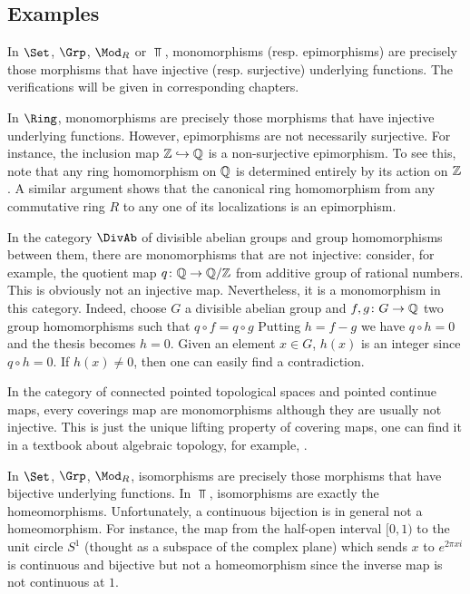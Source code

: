 \subsection{Examples}
  \begin{exam}
    In $\Set$, $\Grp$, $\Mod_R$ or $\Top$, monomorphisms (resp. epimorphisms) are precisely those morphisms that have injective (resp. surjective) underlying functions. The verifications will be given in corresponding chapters.
  \end{exam}
  \begin{exam}\label{exam:nonsurjective epi}
    In $\Ring$, monomorphisms are precisely those morphisms that have injective underlying functions. However, epimorphisms are not necessarily surjective. For instance, the inclusion map ${\mathbb Z}\hookrightarrow{\mathbb Q}$ is a non-surjective epimorphism.
    To see this, note that any ring homomorphism on ${\mathbb Q}$ is determined entirely by its action on ${\mathbb Z}$. A similar argument shows that the canonical ring homomorphism from any commutative ring $R$ to any one of its localizations is an epimorphism.
  \end{exam}
  \begin{exam}\label{exam:noninjective mono}
    In the category $\DivAb$ of divisible abelian groups and group homomorphisms between them, there are monomorphisms that are not injective:
    consider, for example, the quotient map $q\colon{\mathbb Q}\to{\mathbb Q}/{\mathbb Z}$ from additive group of rational numbers. This is obviously not an injective map. Nevertheless, it is a monomorphism in this category.
    Indeed, choose $G$ a divisible abelian group and $f,g\colon G \to{\mathbb Q}$ two group homomorphisms such that $q\circ f = q\circ g$ Putting $h = f - g$ we have $q\circ h = 0$ and the thesis becomes $h=0$. Given an element $x\in G$, $h(x)$ is an integer since $q \circ h = 0$. If $h(x)\neq0$, then one can easily find a contradiction.
  \end{exam}
  \begin{exam}
    In the category of connected pointed topological spaces and pointed continue maps, every coverings map are monomorphisms although they are usually not injective. This is just the unique lifting property of covering maps, one can find it in a textbook about algebraic topology, for example, \cite{AllenHatcher}.
  \end{exam}
  \begin{exam}
    In $\Set$, $\Grp$, $\Mod_R$, isomorphisms are precisely those morphisms that have bijective underlying functions.
    In $\Top$, isomorphisms are exactly the homeomorphisms. Unfortunately, a continuous bijection is in general not a homeomorphism. For instance, the map from the half-open interval $[0,1)$ to the unit circle $S^1$ (thought as a subspace of the complex plane) which sends $x$ to $e^{2\pi x i}$ is continuous and bijective but not a homeomorphism since the inverse map is not continuous at $1$.
  \end{exam}

